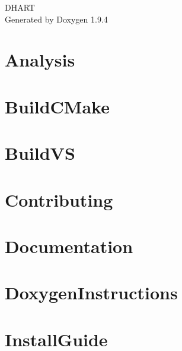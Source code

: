 \documentclass[twoside]{book}
\newcommand{\+}{\discretionary{\mbox{\scriptsize$\hookleftarrow$}}{}{}}
\newcommand{\clearemptydoublepage}{%
    \newpage{\pagestyle{empty}\cleardoublepage}%
  }
\begin{document}
  \raggedbottom
    \hypersetup{pageanchor=false,
                bookmarksnumbered=true,
                pdfencoding=unicode
               }
  \begin{titlepage}
  \vspace*{7cm}
  \begin{center}%
  {\Large DHART}\\
  \vspace*{1cm}
  {\large Generated by Doxygen 1.9.4}\\
  \end{center}
  \end{titlepage}
  \clearemptydoublepage
  \tableofcontents
  \clearemptydoublepage
  \hypersetup{pageanchor=true}
\chapter{Analysis}
\label{index}\hypertarget{index}{}
\chapter{Build\+CMake}
\label{a03459}

\chapter{Build\+VS}
\label{a03460}

\chapter{Contributing}
\label{a03461}

\chapter{Documentation}
\label{a03462}

\chapter{Doxygen\+Instructions}
\label{a03463}

\chapter{Install\+Guide}
\label{a03464}

\end{document}
